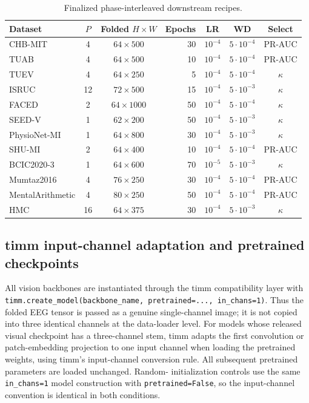 \begin{table}[tbp]
\centering
\caption{Finalized phase-interleaved downstream recipes.}
\label{tab:recipes}
\scriptsize
\setlength{\tabcolsep}{4pt}
\renewcommand{\arraystretch}{1.06}
\begin{tabularx}{\textwidth}{@{}lccrccc@{}}
\toprule
Dataset & $P$ & Folded $H\times W$ & Epochs & LR & WD & Select \\
\midrule
CHB-MIT & 4 & $64\times500$ & 30 & $10^{-4}$ & $5\cdot10^{-4}$ & PR-AUC \\
TUAB & 4 & $64\times500$ & 10 & $10^{-4}$ & $5\cdot10^{-4}$ & PR-AUC \\
TUEV & 4 & $64\times250$ & 5 & $10^{-4}$ & $5\cdot10^{-4}$ & $\kappa$ \\
ISRUC & 12 & $72\times500$ & 15 & $10^{-4}$ & $5\cdot10^{-3}$ & $\kappa$ \\
FACED & 2 & $64\times1000$ & 50 & $10^{-4}$ & $5\cdot10^{-4}$ & $\kappa$ \\
SEED-V & 1 & $62\times200$ & 50 & $10^{-4}$ & $5\cdot10^{-3}$ & $\kappa$ \\
PhysioNet-MI & 1 & $64\times800$ & 30 & $10^{-4}$ & $5\cdot10^{-3}$ & $\kappa$ \\
SHU-MI & 2 & $64\times400$ & 10 & $10^{-4}$ & $5\cdot10^{-4}$ & PR-AUC \\
BCIC2020-3 & 1 & $64\times600$ & 70 & $10^{-5}$ & $5\cdot10^{-3}$ & $\kappa$ \\
Mumtaz2016 & 4 & $76\times250$ & 30 & $10^{-4}$ & $5\cdot10^{-4}$ & PR-AUC \\
MentalArithmetic & 4 & $80\times250$ & 50 & $10^{-4}$ & $5\cdot10^{-4}$ & PR-AUC \\
HMC & 16 & $64\times375$ & 30 & $10^{-4}$ & $5\cdot10^{-3}$ & $\kappa$ \\
\bottomrule
\end{tabularx}
\end{table}

\subsection{timm input-channel adaptation and pretrained checkpoints}
\label{app:timm-input-adaptation}

All vision backbones are instantiated through the timm compatibility layer with
\texttt{timm.create\_model(backbone\_name, pretrained=..., in\_chans=1)}.
Thus the folded EEG tensor is passed as a genuine single-channel image; it is
not copied into three identical channels at the data-loader level. For models
whose released visual checkpoint has a three-channel stem, timm adapts the
first convolution or patch-embedding projection to one input channel when
loading the pretrained weights, using timm's input-channel conversion rule.
All subsequent pretrained parameters are loaded unchanged. Random-
initialization controls use the same \texttt{in\_chans=1} model construction
with \texttt{pretrained=False}, so the input-channel convention is identical
in both conditions.

